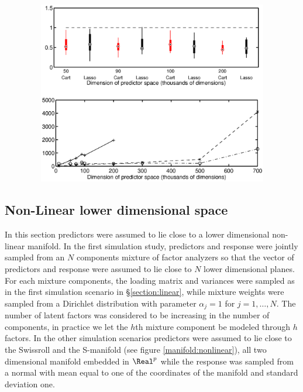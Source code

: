 \begin{figure}[h!]
\centering
\includegraphics[width=120mm,height=80mm]{box_exp1.eps}
\caption{ } \label{boxplot:linear}
\end{figure}





\subsection{Non-Linear lower dimensional space}

In this section predictors were assumed to lie close to a lower dimensional non-linear manifold. In the first simulation study, predictors and response were jointly sampled from an $N$ components mixture of factor analyzers  so that the vector of predictors and response were assumed to lie close to $N$ lower dimensional planes. For each mixture components, the loading matrix and variances were sampled as in the first simulation scenario in \S \ref{section:linear}, while mixture weights were sampled from a Dirichlet distribution with parameter $\alpha_j=1$ for $j=1, \ldots, N$. The number of latent factors was considered to be increasing in the number of components, in practice we let the $h$th mixture component be modeled through $h$ factors. In the other simulation scenarios predictors were assumed to lie close to the Swissroll and the S-manifold (see figure \ref{manifold:nonlinear}), all two dimensional manifold embedded in $\Real^p$ while the response was sampled from a normal with mean equal to one of the coordinates of the manifold and standard deviation one.

